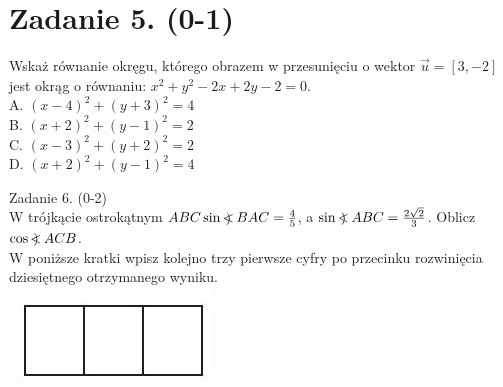 \documentclass[10pt]{article}
\newcommand\Varangle{\mathop{{<\!\!\!\!\!\text{\small)}}\:}\nolimits}
\begin{document}
\section*{Zadanie 5. (0-1)}
Wskaż równanie okręgu, którego obrazem w przesunięciu o wektor \(\vec{u}=[3,-2]\) jest okrąg o równaniu: \(x^{2}+y^{2}-2 x+2 y-2=0\).\\
A. \((x-4)^{2}+(y+3)^{2}=4\)\\
B. \((x+2)^{2}+(y-1)^{2}=2\)\\
C. \((x-3)^{2}+(y+2)^{2}=2\)\\
D. \((x+2)^{2}+(y-1)^{2}=4\)

Zadanie 6. (0-2)\\
W trójkącie ostrokątnym \(A B C \sin \Varangle B A C=\frac{4}{5}\), a \(\sin \Varangle A B C=\frac{2 \sqrt{2}}{3}\). Oblicz \(\cos \Varangle A C B\).\\
W poniższe kratki wpisz kolejno trzy pierwsze cyfry po przecinku rozwinięcia dziesiętnego otrzymanego wyniku.\\
\includegraphics[max width=\textwidth, center]{2024_11_21_a7a52c0c0974ad42b88bg-02}
\end{document}
